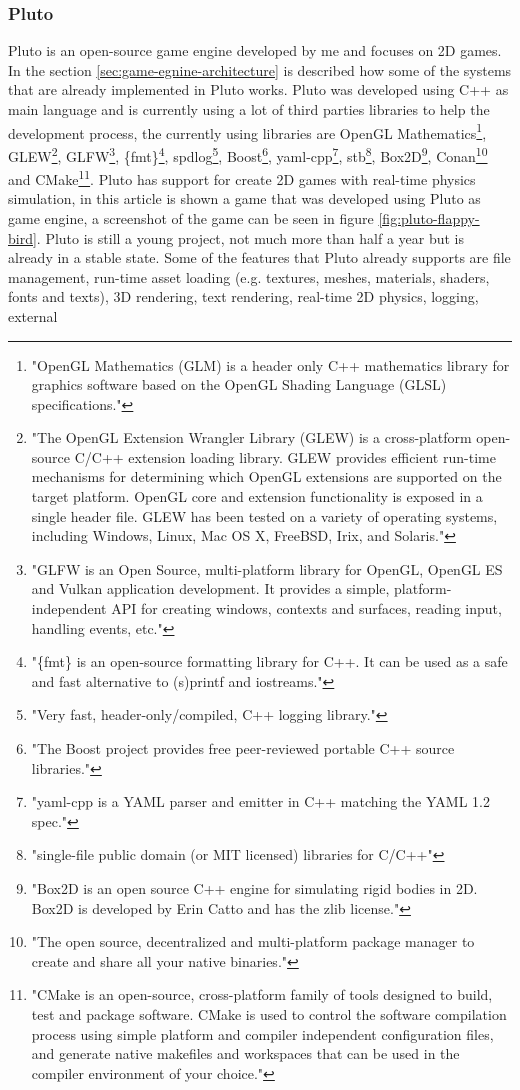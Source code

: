 \subsubsection{Pluto}\label{sec:pluto}
Pluto\cite{PlutoGitHub} is an open-source game engine developed by me and focuses on 2D games. In the section \ref{sec:game-egnine-architecture} is described how some of the systems that are already implemented in Pluto works. Pluto was developed using C++ as main language and is currently using a lot of third parties libraries to help the development process, the currently using libraries are OpenGL Mathematics\footnote{"OpenGL Mathematics (GLM) is a header only C++ mathematics library for graphics software based on the OpenGL Shading Language (GLSL) specifications."\cite{GLM}}, GLEW\footnote{"The OpenGL Extension Wrangler Library (GLEW) is a cross-platform open-source C/C++ extension loading library. GLEW provides efficient run-time mechanisms for determining which OpenGL extensions are supported on the target platform. OpenGL core and extension functionality is exposed in a single header file. GLEW has been tested on a variety of operating systems, including Windows, Linux, Mac OS X, FreeBSD, Irix, and Solaris."\cite{GLEW}}, GLFW\footnote{"GLFW is an Open Source, multi-platform library for OpenGL, OpenGL ES and Vulkan application development. It provides a simple, platform-independent API for creating windows, contexts and surfaces, reading input, handling events, etc."\cite{GLFW}}, \{fmt\}\footnote{"\{fmt\} is an open-source formatting library for C++. It can be used as a safe and fast alternative to (s)printf and iostreams."\cite{fmt}}, spdlog\footnote{"Very fast, header-only/compiled, C++ logging library."\cite{spdlog}}, Boost\footnote{"The Boost project provides free peer-reviewed portable C++ source libraries."\cite{boost}}, yaml-cpp\footnote{"yaml-cpp is a YAML parser and emitter in C++ matching the YAML 1.2 spec."\cite{yaml-cpp}}, stb\footnote{"single-file public domain (or MIT licensed) libraries for C/C++"\cite{stb}}, Box2D\footnote{"Box2D is an open source C++ engine for simulating rigid bodies in 2D. Box2D is developed by Erin Catto and has the zlib license."\cite{Box2DAbout}}, Conan\footnote{"The open source, decentralized and multi-platform package manager to create and share all your native binaries."\cite{conan}} and CMake\footnote{"CMake is an open-source, cross-platform family of tools designed to build, test and package software. CMake is used to control the software compilation process using simple platform and compiler independent configuration files, and generate native makefiles and workspaces that can be used in the compiler environment of your choice."\cite{CMake}}. Pluto has support for create 2D games with real-time physics simulation, in this article is shown a game that was developed using Pluto as game engine, a screenshot of the game can be seen in figure \ref{fig:pluto-flappy-bird}. Pluto is still a young project, not much more than half a year but is already in a stable state. Some of the features that Pluto already supports are file management, run-time asset loading (e.g. textures, meshes, materials, shaders, fonts and texts), 3D rendering, text rendering, real-time 2D physics, logging, external 